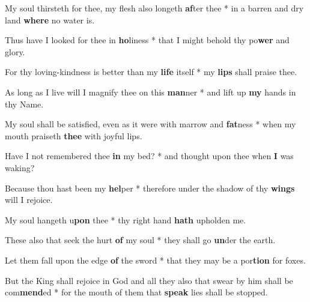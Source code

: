 \begin{multicols}{2}
	My soul thirsteth for thee, my flesh also longeth \textbf{af}ter thee * in a barren and dry land \textbf{where} no water is.
	
	Thus have I looked for thee in \textbf{ho}liness * that I might behold thy po\textbf{wer} and glory.
	
	For thy loving-kindness is better than my \textbf{life} itself * my \textbf{lips} shall praise thee.
	
	As long as I live will I magnify thee on this \textbf{man}ner * and lift up \textbf{my} hands in thy Name.
	
	My soul shall be satisfied, even as it were with marrow and \textbf{fat}ness * when my mouth praiseth \textbf{thee} with joyful lips.
	
	Have I not remembered thee \textbf{in} my bed? * and thought upon thee when \textbf{I} was waking?
	
	Because thou hast been my \textbf{hel}per * therefore under the shadow of thy \textbf{wings} will I rejoice.
	
	My soul hangeth u\textbf{pon} thee * thy right hand \textbf{hath} upholden me.
	
	These also that seek the hurt \textbf{of} my soul * they shall go \textbf{un}der the earth.
	
	Let them fall upon the edge \textbf{of} the sword * that they may be a por\textbf{tion} for foxes.
	
	But the King shall rejoice in God and all they also that swear by him shall be com\textbf{mend}ed * for the mouth of them that \textbf{speak} lies shall be stopped.
\end{multicols}